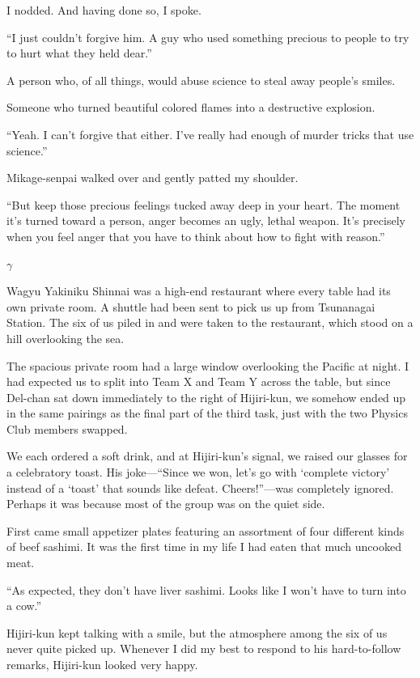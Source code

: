 \documentclass[
    a4paper,
    12pt,
    twoside,
    openany,
    UTF8,
    fontset=windows
]{ctexbook}
\begin{document}
I nodded. And having done so, I spoke.

``I just couldn't forgive him. A guy who used something precious to people to try to hurt what they held dear.''

A person who, of all things, would abuse science to steal away people's smiles.

Someone who turned beautiful colored flames into a destructive explosion.

``Yeah. I can't forgive that either. I've really had enough of murder tricks that use science.''

Mikage-senpai walked over and gently patted my shoulder.

``But keep those precious feelings tucked away deep in your heart. The moment it's turned toward a person, anger becomes an ugly, lethal weapon. It's precisely when you feel anger that you have to think about how to fight with reason.''

$\gamma$

Wagyu Yakiniku Shinnai was a high-end restaurant where every table had its own private room. A shuttle had been sent to pick us up from Tsunanagai Station. The six of us piled in and were taken to the restaurant, which stood on a hill overlooking the sea.

The spacious private room had a large window overlooking the Pacific at night. I had expected us to split into Team X and Team Y across the table, but since Del-chan sat down immediately to the right of Hijiri-kun, we somehow ended up in the same pairings as the final part of the third task, just with the two Physics Club members swapped.

We each ordered a soft drink, and at Hijiri-kun's signal, we raised our glasses for a celebratory toast. His joke---``Since we won, let's go with `complete victory' instead of a `toast' that sounds like defeat. Cheers!''---was completely ignored. Perhaps it was because most of the group was on the quiet side.

First came small appetizer plates featuring an assortment of four different kinds of beef sashimi. It was the first time in my life I had eaten that much uncooked meat.

``As expected, they don't have liver sashimi. Looks like I won't have to turn into a cow.''

Hijiri-kun kept talking with a smile, but the atmosphere among the six of us never quite picked up. Whenever I did my best to respond to his hard-to-follow remarks, Hijiri-kun looked very happy.
\end{document}
